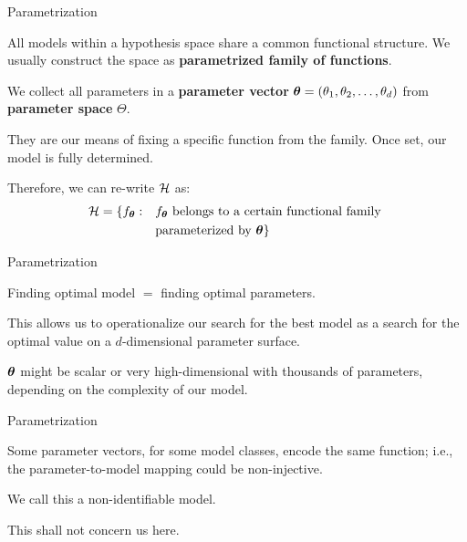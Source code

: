 \documentclass[11pt,compress,t,notes=noshow, xcolor=table]{beamer}
\begin{document}
\begin{framei}{Parametrization}  
\item All models within a hypothesis space share a common functional structure. We usually construct the space as \textbf{parametrized family of functions}.  
\item We collect all parameters in a \textbf{parameter vector} $\bm{\theta} = (\theta_1, \theta_2, \ldots, \theta_d)$ from \textbf{parameter space} $\Theta$.
\item They are our means of fixing a specific function from the family.
Once set, our model is fully determined.
\item Therefore, we can re-write $\mathcal{H}$ as:
\begin{equation*}
\begin{split}
\mathcal{H} = \{f_{\bm{\theta}}: \quad & f_{\bm{\theta}} \text{ belongs to a certain functional family } \\
& \text{parameterized by } \bm{\theta}\}
\end{split}
\end{equation*}
\end{framei}


\begin{framei}{Parametrization}
\item Finding optimal model $=$ finding optimal parameters.
\item This allows us to operationalize our search for the best model as a search for the optimal value on a $d$-dimensional parameter surface.
\item $\bm{\theta}$ might be scalar or very high-dimensional with thousands of parameters, depending on the complexity of our model.
\end{framei}


\begin{framei}{Parametrization}
\item Some parameter vectors, for some model classes, encode the same function; i.e., the parameter-to-model mapping could be non-injective. 
\item We call this a non-identifiable model.
\item This shall not concern us here. 
\end{framei}
\end{document}
